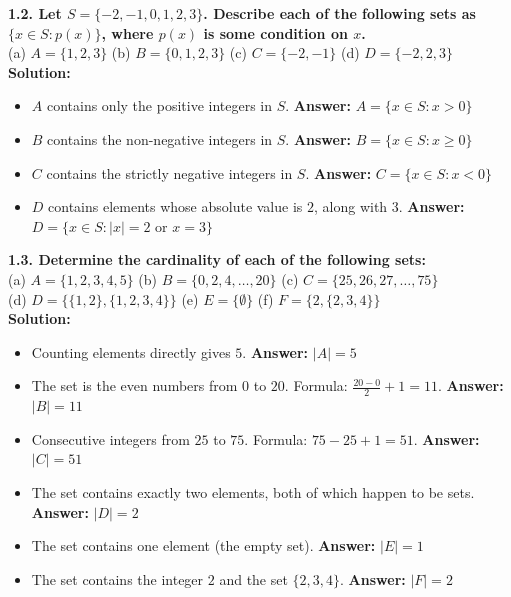 \documentclass[12pt]{article}
\begin{document}
\vspace{0.5cm}
\textbf{1.2. Let $S = \{-2, -1, 0, 1, 2, 3\}$. Describe each of the following sets as $\{x \in S : p(x)\}$, where $p(x)$ is some condition on $x$.} \\
(a) $A = \{1, 2, 3\}$ \quad (b) $B = \{0, 1, 2, 3\}$ \quad (c) $C = \{-2, -1\}$ \quad (d) $D = \{-2, 2, 3\}$ \\
\textbf{Solution:}
\begin{itemize}
    \item[(a)] $A$ contains only the positive integers in $S$. \textbf{Answer:} $A = \{x \in S : x > 0\}$
    \item[(b)] $B$ contains the non-negative integers in $S$. \textbf{Answer:} $B = \{x \in S : x \ge 0\}$
    \item[(c)] $C$ contains the strictly negative integers in $S$. \textbf{Answer:} $C = \{x \in S : x < 0\}$
    \item[(d)] $D$ contains elements whose absolute value is $2$, along with $3$. \textbf{Answer:} $D = \{x \in S : |x| = 2 \text{ or } x = 3\}$
\end{itemize}

\vspace{0.5cm}
\textbf{1.3. Determine the cardinality of each of the following sets:} \\
(a) $A = \{1, 2, 3, 4, 5\}$ \quad (b) $B = \{0, 2, 4, \dots, 20\}$ \quad (c) $C = \{25, 26, 27, \dots, 75\}$ \\
(d) $D = \{\{1, 2\}, \{1, 2, 3, 4\}\}$ \quad (e) $E = \{\emptyset\}$ \quad (f) $F = \{2, \{2, 3, 4\}\}$ \\
\textbf{Solution:}
\begin{itemize}
    \item[(a)] Counting elements directly gives $5$. \textbf{Answer:} $|A| = 5$
    \item[(b)] The set is the even numbers from $0$ to $20$. Formula: $\frac{20-0}{2} + 1 = 11$. \textbf{Answer:} $|B| = 11$
    \item[(c)] Consecutive integers from $25$ to $75$. Formula: $75 - 25 + 1 = 51$. \textbf{Answer:} $|C| = 51$
    \item[(d)] The set contains exactly two elements, both of which happen to be sets. \textbf{Answer:} $|D| = 2$
    \item[(e)] The set contains one element (the empty set). \textbf{Answer:} $|E| = 1$
    \item[(f)] The set contains the integer $2$ and the set $\{2, 3, 4\}$. \textbf{Answer:} $|F| = 2$
\end{itemize}
\end{document}
